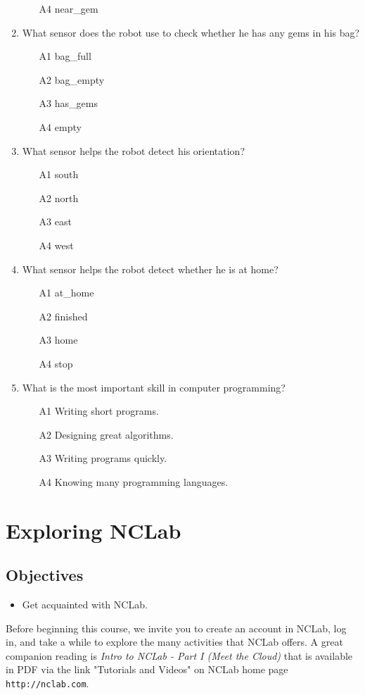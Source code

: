 \documentclass[article,A4,12pt]{llncs}
\begin{document}
\begin{enumerate}
\begin{enumerate}
\item[A4] near\_gem
\end{enumerate}
\item What sensor does the robot use to check whether he has any gems in his bag?
\begin{enumerate}
\item[A1] bag\_full
\item[A2] bag\_empty
\item[A3] has\_gems
\item[A4] empty
\end{enumerate}
\item What sensor helps the robot detect his orientation?
\begin{enumerate}
\item[A1] south
\item[A2] north
\item[A3] east
\item[A4] west
\end{enumerate}
\item What sensor helps the robot detect whether he is at home?
\begin{enumerate}
\item[A1] at\_home
\item[A2] finished
\item[A3] home
\item[A4] stop
\end{enumerate}
\item What is the most important skill in computer programming?
\begin{enumerate}
\item[A1] Writing short programs.
\item[A2] Designing great algorithms.
\item[A3] Writing programs quickly.
\item[A4] Knowing many programming languages.
\end{enumerate}
\end{enumerate}

\section{Exploring NCLab}

\subsection{Objectives} 

\begin{itemize}
\item Get acquainted with NCLab.
\end{itemize}
Before beginning this course, we invite you to create an account in 
NCLab, log in, and take a while to explore the many activities 
that NCLab offers. A great companion reading is {\em Intro to NCLab - Part I 
(Meet the Cloud)} that is available in PDF via the link "Tutorials and Videos"
on NCLab home page {\tt http://nclab.com}.
\end{document}
